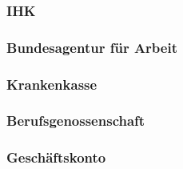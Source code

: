 \subsubsection{IHK} \label{ihk}

\subsubsection{Bundesagentur für Arbeit} \label{bundesagenturFuerArbeit}

\subsubsection{Krankenkasse} \label{krankenkasse}

\subsubsection{Berufsgenossenschaft} \label{berufsgenossenschaft}

\subsubsection{Geschäftskonto} \label{geschaeftskonto}
